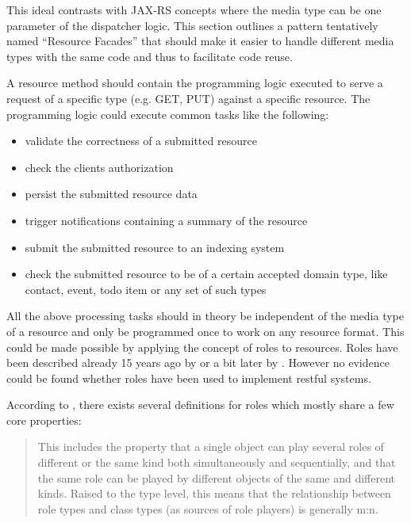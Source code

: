 \documentclass[12pt,a4paper]{scrartcl}		%
\begin{document}
This ideal contrasts with JAX-RS concepts where the media type can be one
parameter of the dispatcher logic. This section outlines a pattern tentatively
named ``Resource Facades'' that should make it easier to handle different media
types with the same code and thus to facilitate code reuse.


A resource method should contain the programming logic executed to serve a
request of a specific type (e.g. GET, PUT) against a specific resource. The
programming logic could execute common tasks like the following:

\begin{itemize}
\item validate the correctness of a submitted resource
\item check the clients authorization
\item persist the submitted resource data
\item trigger notifications containing a summary of the resource
\item submit the submitted resource to an indexing system
\item check the submitted resource to be of a certain accepted domain type, like
  contact, event, todo item or any set of such types
\end{itemize}

All the above processing tasks should in theory be independent of the media type
of a resource and only be programmed once to work on any resource format. This
could be made possible by applying the concept of roles to resources. Roles have
been described already 15 years ago by \cite{Fowler1997} or a bit later by
\cite{Baeumer2000}. However no evidence could be found whether roles have been
used to implement restful systems.

According to \cite{Steimann2008}, there exists several definitions for roles
which mostly share a few core properties:

\begin{quote}
  This includes the property that a single object can play several roles of
  different or the same kind both simultaneously and sequentially, and that the
  same role can be played by different objects of the same and different
  kinds. Raised to the type level, this means that the relationship between role
  types and class types (as sources of role players) is generally m:n.
\end{quote}
\end{document}
